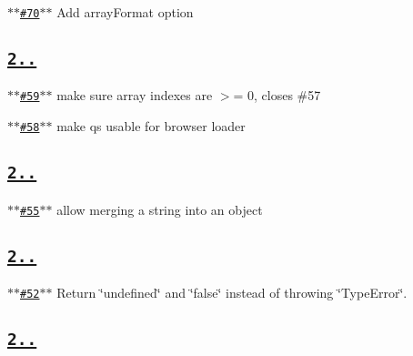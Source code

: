 \begin{DoxyItemize}
\item \href{https://github.com/ljharb/qs/issues/70}{\tt $\ast$$\ast$\#70$\ast$$\ast$} Add array\+Format option
\end{DoxyItemize}

\subsection*{\href{https://github.com/ljharb/qs/issues?milestone=18&state=closed}{\tt {\bfseries 2..}}}


\begin{DoxyItemize}
\item \href{https://github.com/ljharb/qs/issues/59}{\tt $\ast$$\ast$\#59$\ast$$\ast$} make sure array indexes are $>$= 0, closes \#57
\item \href{https://github.com/ljharb/qs/issues/58}{\tt $\ast$$\ast$\#58$\ast$$\ast$} make qs usable for browser loader
\end{DoxyItemize}

\subsection*{\href{https://github.com/ljharb/qs/issues?milestone=17&state=closed}{\tt {\bfseries 2..}}}


\begin{DoxyItemize}
\item \href{https://github.com/ljharb/qs/issues/55}{\tt $\ast$$\ast$\#55$\ast$$\ast$} allow merging a string into an object
\end{DoxyItemize}

\subsection*{\href{https://github.com/ljharb/qs/issues?milestone=16&state=closed}{\tt {\bfseries 2..}}}


\begin{DoxyItemize}
\item \href{https://github.com/ljharb/qs/issues/52}{\tt $\ast$$\ast$\#52$\ast$$\ast$} Return \char`\"{}undefined\char`\"{} and \char`\"{}false\char`\"{} instead of throwing \char`\"{}\+Type\+Error\char`\"{}.
\end{DoxyItemize}

\subsection*{\href{https://github.com/ljharb/qs/issues?milestone=15&state=closed}{\tt {\bfseries 2..}}}


